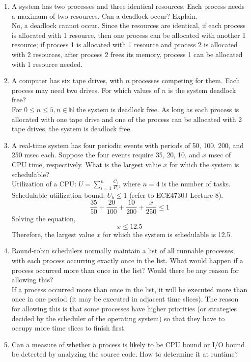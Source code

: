 \documentclass[a4paper]{article}
\begin{document}
\begin{enumerate}
    \item A system has two processes and three identical resources. Each process needs a maximum of two resources. Can a deadlock occur? Explain.\\
    No, a deadlock cannot occur. Since the resources are identical, if each process is allocated with 1 resource, then one process can be allocated with another 1 resource; if process 1 is allocated with 1 resource and process 2 is allocated with 2 resources, after process 2 frees its memory, process 1 can be allocated with 1 resource needed.
    \item A computer has six tape drives, with $n$ processes competing for them. Each process may need two drives. For which values of $n$ is the system deadlock free?\\
    For $0\leq n\leq5,n\in\mathbb{N}$ the system is deadlock free. As long as each process is allocated with one tape drive and one of the process can be allocated with 2 tape drives, the system is deadlock free.
    \item A real-time system has four periodic events with periods of 50, 100, 200, and 250 msec each. Suppose the four events require 35, 20, 10, and $x$ msec of CPU time, respectively. What is the largest value $x$ for which the system is schedulable?\\
    Utilization of a CPU: $U=\sum_{i=1}^n{\frac{C_i}{P_i}}$, where $n=4$ is the number of tasks.\\
    Schedulable utiilization bound: $U_b\leq1$ (refer to ECE4730J Lecture 8).
    \[\frac{35}{50}+\frac{20}{100}+\frac{10}{200}+\frac{x}{250}\leq1\]
    Solving the equation,
    \[x\leq12.5\]
    Therefore, the largest value $x$ for which the system is schedulable is 12.5.
    \item Round-robin schedulers normally maintain a list of all runnable processes, with each process occurring exactly once in the list. What would happen if a process occurred more than once in the list? Would there be any reason for allowing this?\\
    If a process occurred more than once in the list, it will be executed more than once in one period (it may be executed in adjacent time slices). The reason for allowing this is that some processes have higher priorities (or strategies decided by the scheduler of the operating system) so that they have to occupy more time slices to finish first.
    \item Can a measure of whether a process is likely to be CPU bound or I/O bound be detected by analyzing the source code. How to determine it at runtime?\\

\end{enumerate}
\end{document}
